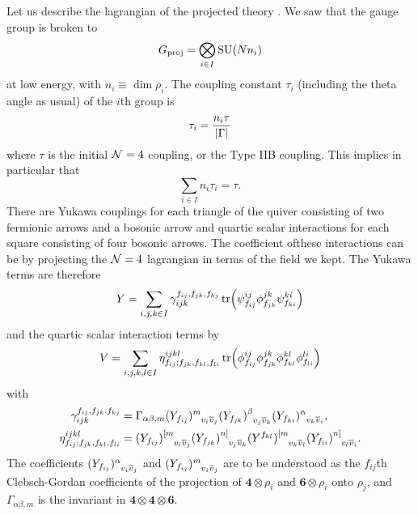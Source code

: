                 Let us describe the lagrangian of the projected theory \cite{vafa1998}. We saw that the gauge group is broken to 
                \begin{equation}
                    G_{\text{proj}}=\bigotimes_{i\in I}\text{SU}(N n_i)
                \end{equation}
                at low energy, with $n_i\equiv\dim\rho_i$. The coupling constant $\tau_i$ (including the theta angle as usual) of the $i$th group is
                \begin{equation}
                    \tau_i=\frac{n_i\tau}{\abs{\Gamma}}
                \end{equation}
                where $\tau$ is the initial $\mathcal{N}=4$ coupling, or the Type IIB coupling. This implies in particular that
                \begin{equation}
                    \sum_{i\in I}n_i\tau_i=\tau.
                \end{equation}
                There are Yukawa couplings for each triangle of the quiver consisting of two fermionic arrows and a bosonic arrow and quartic scalar interactions for each square consisting of four bosonic arrows. The coefficient ofthese interactions can be by projecting the $\mathcal{N}=4$ lagrangian in terms of the field we kept. The Yukawa terms are therefore
                \begin{equation}
                    Y=\sum_{i,j,k\in I}\gamma^{f_{ij},f_{jk},f_{kj}}_{ijk}\tr(\psi^{ij}_{f_{ij}}\phi^{jk}_{f_{jk}}\psi^{ki}_{f_{ki}})
                \end{equation}
                and the quartic scalar interaction terms by
                \begin{equation}
                    V=\sum_{i,j,k,l\in I}\eta^{ijkl}_{f_{ij};f_{jk},f_{kl},f_{li}}\tr(\phi^{ij}_{f_{ij}}\phi^{jk}_{f_{jk}}\phi^{kl}_{f_{kl}}\phi^{li}_{f_{li}})
                \end{equation}
                with
                \begin{align}
                    \gamma^{f_{ij},f_{jk},f_{kj}}_{ijk} &= \Gamma_{\alpha\beta,m}(Y_{f_{ij}})\indices{^m_{v_i\bar{v}_j}}(Y_{f_{jk}})\indices{^\beta_{v_j\bar{v}_k}}(Y_{f_{ki}})\indices{^\alpha_{v_k\bar{v}_i}}, \\
                    \eta^{ijkl}_{f_{ij};f_{jk},f_{kl},f_{li}} &= (Y_{f_{ij}})\indices{^{[m}_{v_i\bar{v}_j}}(Y_{f_{jk}})\indices{^{n]}_{v_j\bar{v}_k}}(Y^{f_{kl}})\indices{^{[m}_{v_k\bar{v}_l}}(Y_{f_{li}})\indices{^{n]}_{v_l\bar{v}_i}}.
                \end{align}
                The coefficients $(Y_{f_{ij}})\indices{^\alpha_{v_i\bar{v}_j}}$ and $(Y_{f_{ij}})\indices{^m_{v_i\bar{v}_j}}$ are to be understood as the $f_{ij}$th Clebsch-Gordan coefficients of the projection of $\boldsymbol{4}\otimes\rho_i$ and $\boldsymbol{6}\otimes\rho_i$ onto $\rho_j$, and $\Gamma_{\alpha\beta,m}$ is the invariant in $\boldsymbol{4}\otimes\boldsymbol{4}\otimes\boldsymbol{6}$.
        
